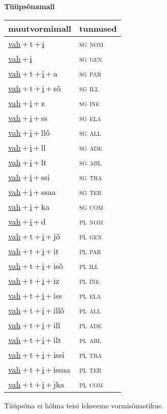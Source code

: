 
\vspace{1.8em}
\begin{minipage}{\textwidth}
\textbf{Tüüpsõnamall \,}\\

\begin{sideways}
\begin{tabular}{l l}
muutvormimall & tunnused \\
\hline
\underline{vah}\,+\,t\,+\,\underline{i} & \textsc{ sg nom } \\
\underline{vah}\,+\,\underline{i} & \textsc{ sg gen } \\
\underline{vah}\,+\,t\,+\,\underline{i}\,+\,a & \textsc{ sg par } \\
\underline{vah}\,+\,t\,+\,\underline{i}\,+\,sõ & \textsc{ sg ill } \\
\underline{vah}\,+\,\underline{i}\,+\,z & \textsc{ sg ine } \\
\underline{vah}\,+\,\underline{i}\,+\,ss & \textsc{ sg ela } \\
\underline{vah}\,+\,\underline{i}\,+\,llõ & \textsc{ sg all } \\
\underline{vah}\,+\,\underline{i}\,+\,ll & \textsc{ sg ade } \\
\underline{vah}\,+\,\underline{i}\,+\,lt & \textsc{ sg abl } \\
\underline{vah}\,+\,\underline{i}\,+\,ssi & \textsc{ sg tra } \\
\underline{vah}\,+\,\underline{i}\,+\,ssaa & \textsc{ sg ter } \\
\underline{vah}\,+\,\underline{i}\,+\,ka & \textsc{ sg com } \\
\underline{vah}\,+\,\underline{i}\,+\,d & \textsc{ pl nom } \\
\underline{vah}\,+\,t\,+\,\underline{i}\,+\,jõ & \textsc{ pl gen } \\
\underline{vah}\,+\,t\,+\,\underline{i}\,+\,it & \textsc{ pl par } \\
\underline{vah}\,+\,t\,+\,\underline{i}\,+\,isõ & \textsc{ pl ill } \\
\underline{vah}\,+\,t\,+\,\underline{i}\,+\,iz & \textsc{ pl ine } \\
\underline{vah}\,+\,t\,+\,\underline{i}\,+\,iss & \textsc{ pl ela } \\
\underline{vah}\,+\,t\,+\,\underline{i}\,+\,illõ & \textsc{ pl all } \\
\underline{vah}\,+\,t\,+\,\underline{i}\,+\,ill & \textsc{ pl ade } \\
\underline{vah}\,+\,t\,+\,\underline{i}\,+\,ilt & \textsc{ pl abl } \\
\underline{vah}\,+\,t\,+\,\underline{i}\,+\,issi & \textsc{ pl tra } \\
\underline{vah}\,+\,t\,+\,\underline{i}\,+\,issaa & \textsc{ pl ter } \\
\underline{vah}\,+\,t\,+\,\underline{i}\,+\,jka & \textsc{ pl com } \\
\end{tabular}
\end{sideways}
\label{tab:tüüpsõnamall-vahti}

\end{minipage}

 
\vspace{1em}
\noindent Tüüpsõna ei hõlma teisi lekseeme vormi\-sõnastikus.
